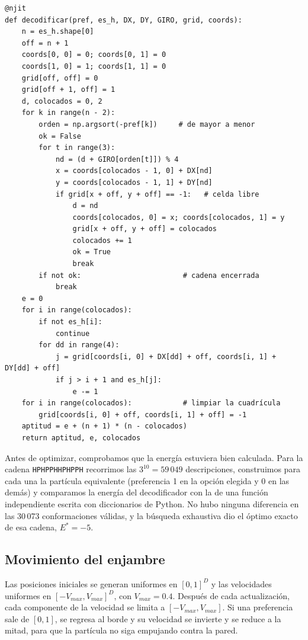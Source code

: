 \begin{lstlisting}[caption={Decodificación de las preferencias de una partícula.}, label={cod:decodificar}]
@njit
def decodificar(pref, es_h, DX, DY, GIRO, grid, coords):
    n = es_h.shape[0]
    off = n + 1
    coords[0, 0] = 0; coords[0, 1] = 0
    coords[1, 0] = 1; coords[1, 1] = 0
    grid[off, off] = 0
    grid[off + 1, off] = 1
    d, colocados = 0, 2
    for k in range(n - 2):
        orden = np.argsort(-pref[k])     # de mayor a menor
        ok = False
        for t in range(3):
            nd = (d + GIRO[orden[t]]) % 4
            x = coords[colocados - 1, 0] + DX[nd]
            y = coords[colocados - 1, 1] + DY[nd]
            if grid[x + off, y + off] == -1:   # celda libre
                d = nd
                coords[colocados, 0] = x; coords[colocados, 1] = y
                grid[x + off, y + off] = colocados
                colocados += 1
                ok = True
                break
        if not ok:                        # cadena encerrada
            break
    e = 0
    for i in range(colocados):
        if not es_h[i]:
            continue
        for dd in range(4):
            j = grid[coords[i, 0] + DX[dd] + off, coords[i, 1] + DY[dd] + off]
            if j > i + 1 and es_h[j]:
                e -= 1
    for i in range(colocados):            # limpiar la cuadrícula
        grid[coords[i, 0] + off, coords[i, 1] + off] = -1
    aptitud = e + (n + 1) * (n - colocados)
    return aptitud, e, colocados
\end{lstlisting}

Antes de optimizar, comprobamos que la energía estuviera bien calculada. Para la cadena \texttt{HPHPPHHPHPPH} recorrimos las $3^{10} = 59\,049$ descripciones, construimos para cada una la partícula equivalente (preferencia 1 en la opción elegida y 0 en las demás) y comparamos la energía del decodificador con la de una función independiente escrita con diccionarios de Python. No hubo ninguna diferencia en las 30\,073 conformaciones válidas, y la búsqueda exhaustiva dio el óptimo exacto de esa cadena, $E^* = -5$.

\subsection{Movimiento del enjambre}
\label{sec:movimiento}

Las posiciones iniciales se generan uniformes en $[0,1]^D$ y las velocidades uniformes en $[-V_{max}, V_{max}]^D$, con $V_{max} = 0.4$. Después de cada actualización, cada componente de la velocidad se limita a $[-V_{max}, V_{max}]$. Si una preferencia sale de $[0,1]$, se regresa al borde y su velocidad se invierte y se reduce a la mitad, para que la partícula no siga empujando contra la pared.

